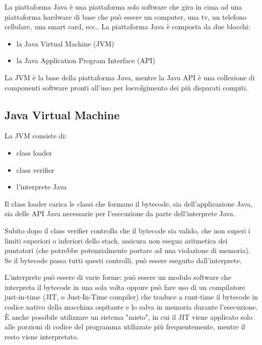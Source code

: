 La  piattaforma  Java  \`e  una  piattaforma  solo software che  gira  in  cima  ad  una  piattaforma 
hardware di base che pu\`o essere un computer, una tv, un telefono cellulare, una smart card, 
ecc..  La piattaforma Java \`e composta da due blocchi: 
\begin{itemize}
\item la Java Virtual Machine (JVM)
\item la Java Application Program Interface (API)
\end{itemize} 
La JVM \`e  la  base  della  piattaforma  Java, mentre la Java API \`e  una  collezione  di componenti software pronti all’uso per losvolgimento dei pi\`u disparati compiti.
\subsection*{Java Virtual Machine} 
La JVM consiste di:
\begin{itemize}
\item class loader
\item class verifier
\item l'interprete Java
\end{itemize}
Il class loader carica le classi che formano il bytecode, sia dell'applicazione Java, sia delle API Java necessarie per l'esecuzione da parte dell'interprete Java.

Subito dopo il class verifier controlla che il bytecode sia valido, che non superi i limiti superiori o inferiori dello stack, assicura non esegua aritmetica dei puntatori (che potrebbe potenzialmente portare ad una violazione di memoria). Se il bytecode passa tutti questi controlli, pu\`o essere eseguito dall'interprete.

L'interprete pu\`o essere di varie forme: pu\`o essere un modulo software che interpreta il bytecode in una sola volta oppure pu\`o fare uso di un compilatore just-in-time (JIT, o Just-In-Time compiler) che traduce a runt-time il bytecode in codice nativo della macchina ospitante e lo salva in memoria durante l'esecuzione. \`E anche possibile utilizzare un sistema "misto", in cui il JIT viene applicato solo alle porzioni di codice del programma utilizzate pi\`u frequentemente, mentre il resto viene interpretato.
